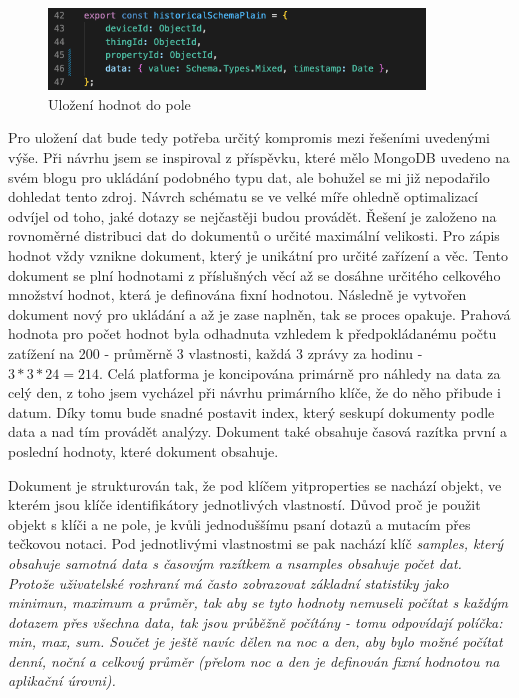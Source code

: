 \documentclass{article}
\begin{document}
\begin{figure}[htbp]
\includegraphics[width=10cm]{images/basic_schema.png}
\centering 
\caption{Uložení hodnot do pole}
\end{figure}

Pro uložení dat bude tedy potřeba určitý kompromis mezi řešeními uvedenými výše. Při návrhu jsem se inspiroval z příspěvku, které mělo MongoDB uvedeno na svém blogu pro ukládání podobného typu dat, ale bohužel se mi již nepodařilo dohledat tento zdroj. Návrch schématu se ve velké míře ohledně optimalizací odvíjel od toho, jaké dotazy se nejčastěji budou provádět. Řešení je založeno na rovnoměrné distribuci dat do dokumentů o určité maximální velikosti. Pro zápis hodnot vždy vznikne dokument, který je unikátní pro určité zařízení a věc. Tento dokument se plní hodnotami z příslušných věcí až se dosáhne určitého celkového množství hodnot, která je definována fixní hodnotou. Následně je vytvořen dokument nový pro ukládání a až je zase naplněn, tak se proces opakuje. Prahová hodnota pro počet hodnot byla odhadnuta vzhledem k předpokládanému počtu zatížení na 200 - průměrně 3 vlastnosti, každá 3 zprávy za hodinu - \(3*3*24 = 214\). Celá platforma je koncipována primárně pro náhledy na data za celý den, z toho jsem vycházel při návrhu primárního klíče, že do něho přibude i datum. Díky tomu bude snadné postavit index, který seskupí dokumenty podle data a nad tím provádět analýzy. Dokument také obsahuje časová razítka první a poslední hodnoty, které dokument obsahuje.

Dokument je strukturován tak, že pod klíčem yit{properties} se nachází objekt, ve kterém jsou klíče identifikátory jednotlivých vlastností. Důvod proč je použit objekt s klíči a ne pole, je kvůli jednoduššímu psaní dotazů a mutacím přes tečkovou notaci. Pod jednotlivými vlastnostmi se pak nachází klíč \it{samples}, který obsahuje samotná data s časovým razítkem a \it{nsamples} obsahuje počet dat. Protože uživatelské rozhraní má často zobrazovat základní statistiky jako minimun, maximum a průměr, tak aby se tyto hodnoty nemuseli počítat s každým dotazem přes všechna data, tak jsou průběžně počítány - tomu odpovídají políčka: \it{min}, \it{max}, \it{sum}. Součet je ještě navíc dělen na noc a den, aby bylo možné počítat denní, noční a celkový průměr (přelom noc a den je definován fixní hodnotou na aplikační úrovni).
\end{document}
